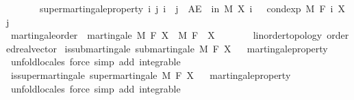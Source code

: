 \begin{isabellebody}
\ \ \ \ \ \ \ supermartingale{\isacharunderscore}{\kern0pt}property{\isacharcolon}{\kern0pt}\ {\isachardoublequoteopen}{\isasymAnd}i\ j{\isachardot}{\kern0pt}\ i\ {\isasymle}\ j\ {\isasymLongrightarrow}\ AE\ {\isasymxi}\ in\ M{\isachardot}{\kern0pt}\ X\ i\ {\isasymxi}\ {\isasymge}\ cond{\isacharunderscore}{\kern0pt}exp\ M\ {\isacharparenleft}{\kern0pt}F\ i{\isacharparenright}{\kern0pt}\ {\isacharparenleft}{\kern0pt}X\ j{\isacharparenright}{\kern0pt}\ {\isasymxi}{\isachardoublequoteclose}%
\isadelimdocument
%
\endisadelimdocument
%
\isatagdocument
%
\isamarkuptrue%
%
\endisatagdocument
{\isafolddocument}%
%
\isadelimdocument
%
\endisadelimdocument
{}\isamarkupfalse%
\ martingale{\isacharunderscore}{\kern0pt}order\ {\isacharequal}{\kern0pt}\ martingale\ M\ F\ X\ \ M\ F\ \ X\ {\isacharcolon}{\kern0pt}{\isacharcolon}{\kern0pt}\ {\isachardoublequoteopen}{\isacharunderscore}{\kern0pt}\ {\isasymRightarrow}\ {\isacharunderscore}{\kern0pt}\ {\isasymRightarrow}\ {\isacharunderscore}{\kern0pt}\ {\isacharcolon}{\kern0pt}{\isacharcolon}{\kern0pt}\ {\isacharbraceleft}{\kern0pt}linorder{\isacharunderscore}{\kern0pt}topology{\isacharcomma}{\kern0pt}\ ordered{\isacharunderscore}{\kern0pt}real{\isacharunderscore}{\kern0pt}vector{\isacharbraceright}{\kern0pt}{\isachardoublequoteclose}\isanewline
{}\isanewline
\isanewline
{}\isamarkupfalse%
\ is{\isacharunderscore}{\kern0pt}submartingale{\isacharcolon}{\kern0pt}\ {\isachardoublequoteopen}submartingale\ M\ F\ X{\isachardoublequoteclose}%
\isadelimproof
\ %
\endisadelimproof
%
\isatagproof
{}\isamarkupfalse%
\ martingale{\isacharunderscore}{\kern0pt}property\ \isamarkupfalse%
\ {\isacharparenleft}{\kern0pt}unfold{\isacharunderscore}{\kern0pt}locales{\isacharparenright}{\kern0pt}\ {\isacharparenleft}{\kern0pt}force\ simp\ add{\isacharcolon}{\kern0pt}\ integrable{\isacharparenright}{\kern0pt}{\isacharplus}{\kern0pt}%
\endisatagproof
{\isafoldproof}%
%
\isadelimproof
%
\endisadelimproof
\isanewline
\isanewline
{}\isamarkupfalse%
\ is{\isacharunderscore}{\kern0pt}supermartingale{\isacharcolon}{\kern0pt}\ {\isachardoublequoteopen}supermartingale\ M\ F\ X{\isachardoublequoteclose}%
\isadelimproof
\ %
\endisadelimproof
%
\isatagproof
{}\isamarkupfalse%
\ martingale{\isacharunderscore}{\kern0pt}property\ \isamarkupfalse%
\ {\isacharparenleft}{\kern0pt}unfold{\isacharunderscore}{\kern0pt}locales{\isacharparenright}{\kern0pt}\ {\isacharparenleft}{\kern0pt}force\ simp\ add{\isacharcolon}{\kern0pt}\ integrable{\isacharparenright}{\kern0pt}{\isacharplus}{\kern0pt}%

\end{isabellebody}
